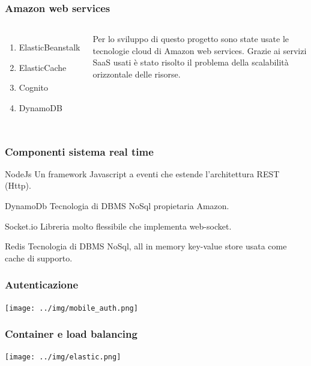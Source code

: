 \documentclass{beamer}
\begin{document}

\begin{frame}
\frametitle{Amazon web services}
\begin{columns}[c] 


\begin{enumerate}
\item ElasticBeanstalk
\item ElasticCache
\item Cognito
\item DynamoDB
\end{enumerate}

Per lo sviluppo di questo progetto sono state usate le tecnologie cloud di Amazon web services. Grazie ai servizi SaaS usati \`e stato risolto il problema della scalabilit\`a orizzontale delle risorse.

\end{columns}
\end{frame}



\begin{frame}
\frametitle{Componenti sistema real time}
\begin{block}{NodeJs}
Un framework Javascript a eventi che estende l'architettura REST (Http). 
\end{block}

\begin{block}{DynamoDb}
Tecnologia di DBMS NoSql propietaria Amazon.
\end{block}

\begin{block}{Socket.io}
Libreria molto flessibile che implementa web-socket.
\end{block}

\begin{block}{Redis}
Tecnologia di DBMS NoSql, all in memory key-value store usata come cache di supporto.
\end{block}
\end{frame}





\begin{frame}
\frametitle{Autenticazione}
\centerline{\texttt{[image: ../img/mobile\_auth.png]}}
\end{frame}


\begin{frame}
\frametitle{Container e load balancing}
\centerline{\texttt{[image: ../img/elastic.png]}}
\end{frame}
\end{document}
